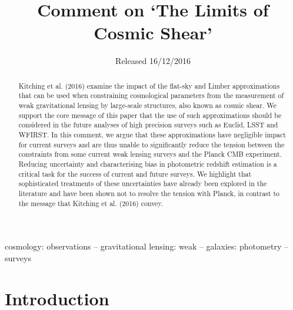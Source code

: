 \documentclass[fleqn, usenatbib]{mnras}
\title[Comment on `The Limits of Cosmic Shear']{Comment on `The Limits of Cosmic Shear'}
\date{Released 16/12/2016}
\begin{document}
\setlength{\voffset}{-12mm}

\label{firstpage}

\maketitle

\begin{abstract}


Kitching et al. (2016) examine the impact of the flat-sky and Limber approximations that can be used when constraining cosmological parameters from the measurement of weak gravitational lensing by large-scale structures, also known as cosmic shear.  We support the core message of this paper that the use of such approximations should be considered in the future analyses of high precision surveys such as Euclid, LSST and WFIRST.  In this comment, we argue that these approximations have negligible impact for current surveys and are thus unable to significantly reduce the tension between the constraints from some current weak lensing surveys and the Planck CMB experiment.  Reducing uncertainty and characterising bias in photometric redshift estimation is a critical task for the success of current and future surveys.  We highlight that sophisticated treatments of these uncertainties have already been explored in the literature and have been shown not to resolve the tension with Planck, in contrast to the message that Kitching et al. (2016) convey.

\end{abstract}

\begin{keywords}
cosmology: observations -- gravitational lensing: weak -- galaxies: photometry -- surveys
\end{keywords}


\section{Introduction}
\end{document}
